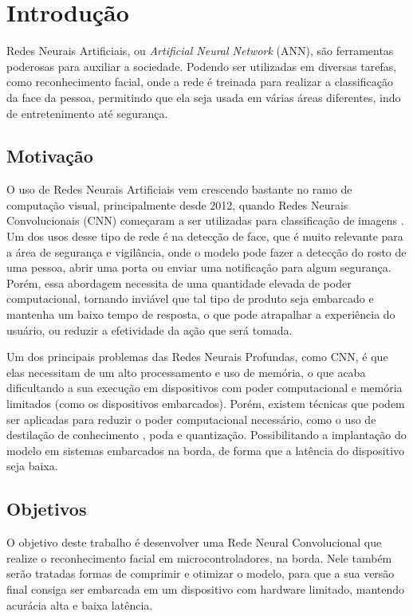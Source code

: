 \chapter{Introdução}

Redes Neurais Artificiais, ou \textit{Artificial Neural Network} (ANN), são ferramentas poderosas para auxiliar a
sociedade.
Podendo ser utilizadas em diversas tarefas, como reconhecimento facial, onde a rede é treinada para realizar a
classificação da face da pessoa, permitindo que ela seja usada em várias áreas diferentes, indo de entretenimento até
segurança.

\section{Motivação}
O uso de Redes Neurais Artificiais vem crescendo bastante no ramo de computação visual, principalmente desde 2012,
quando Redes Neurais Convolucionais (CNN) começaram a ser utilizadas para classificação de imagens \cite{alexnet}.
Um dos usos desse tipo de rede é na detecção de face, que é muito relevante para a área de segurança e
vigilância, onde o modelo pode fazer a detecção do rosto de uma pessoa, abrir uma porta ou enviar uma notificação
para algum segurança.
Porém, essa abordagem necessita de uma quantidade elevada de poder computacional, tornando inviável que tal tipo de
produto seja embarcado e mantenha um baixo tempo de resposta, o que pode atrapalhar a experiência do usuário, ou
reduzir a efetividade da ação que será tomada.

Um dos principais problemas das Redes Neurais Profundas, como CNN, é que elas necessitam de um alto processamento e uso
de memória, o que acaba dificultando a sua execução em dispositivos com poder computacional e memória limitados (como os dispositivos embarcados).
Porém, existem técnicas que podem ser aplicadas para reduzir o poder computacional necessário, como o uso de
destilação de conhecimento \cite{hinton2015distilling}, poda e quantização.
Possibilitando a implantação do modelo em sistemas embarcados na borda, de forma que a latência do dispositivo seja
baixa.

\section{Objetivos}

O objetivo deste trabalho é desenvolver uma Rede Neural Convolucional que realize o reconhecimento facial em
microcontroladores, na borda.
Nele também serão tratadas formas de comprimir e otimizar o modelo, para que a sua versão final consiga ser embarcada
em um dispositivo com hardware limitado, mantendo acurácia alta e baixa latência.

